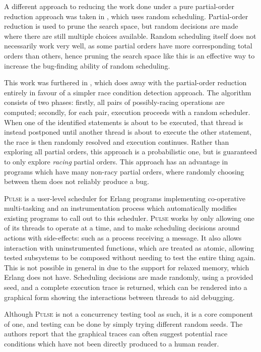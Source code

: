 
A different approach to reducing the work done under a pure
partial-order reduction approach was taken in \citep{rapos}, which
uses random scheduling. Partial-order reduction is used to prune the
search space, but random decisions are made where there are still
multiple choices available. Random scheduling itself does not
necessarily work very well, as some partial orders have more
corresponding total orders than others, hence pruning the search space
like this is an effective way to increase the bug-finding ability of
random scheduling.

This work was furthered in \citep{racefuzzer}, which does away with
the partial-order reduction entirely in favour of a simpler race
condition detection approach. The algorithm consists of two phases:
firstly, all pairs of possibly-racing operations are computed;
secondly, for each pair, execution proceeds with a random
scheduler. When one of the identified statements is about to be
executed, that thread is instead postponed until another thread is
about to execute the other statement, the race is then randomly
resolved and execution continues. Rather than exploring all partial
orders, this approach is a probabilistic one, but is guaranteed to
only explore \emph{racing} partial orders. This approach has an
advantage in programs which have many non-racy partial orders, where
randomly choosing between them does not reliably produce a bug.


\textsc{Pulse} \citep{pulse} is a user-level scheduler for Erlang
programs implementing co-operative multi-tasking and an
instrumentation process which automatically modifies existing programs
to call out to this scheduler. \textsc{Pulse} works by only allowing
one of its threads to operate at a time, and to make scheduling
decisions around actions with side-effects: such as a process
receiving a message. It also allows interaction with uninstrumented
functions, which are treated as atomic, allowing tested subsystems to
be composed without needing to test the entire thing again. This is
not possible in general in \dejafu{} due to the support for relaxed
memory, which Erlang does not have. Scheduling decisions are made
randomly, using a provided seed, and a complete execution trace is
returned, which can be rendered into a graphical form showing the
interactions between threads to aid debugging.

Although \textsc{Pulse} is not a concurrency testing tool as such, it
is a core component of one, and testing can be done by simply trying
different random seeds. The authors report that the graphical traces
can often suggest potential race conditions which have not been
directly produced to a human reader.


